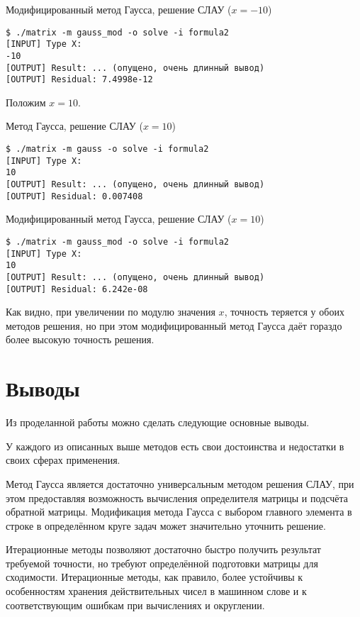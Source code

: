 \documentclass[a4paper,11pt]{report}
\begin{document}
\begin{bash}
\caption{Модифицированный метод Гаусса, решение СЛАУ ($x = -10$)}
\begin{verbatim}
$ ./matrix -m gauss_mod -o solve -i formula2 
[INPUT] Type X:
-10
[OUTPUT] Result: ... (опущено, очень длинный вывод)
[OUTPUT] Residual: 7.4998e-12
\end{verbatim}
\end{bash}

Положим $x = 10$.

\begin{bash}
\caption{Метод Гаусса, решение СЛАУ ($x = 10$)}
\begin{verbatim}
$ ./matrix -m gauss -o solve -i formula2 
[INPUT] Type X:
10
[OUTPUT] Result: ... (опущено, очень длинный вывод)
[OUTPUT] Residual: 0.007408
\end{verbatim}
\end{bash}


\begin{bash}
\caption{Модифицированный метод Гаусса, решение СЛАУ ($x = 10$)}
\begin{verbatim}
$ ./matrix -m gauss_mod -o solve -i formula2 
[INPUT] Type X:
10
[OUTPUT] Result: ... (опущено, очень длинный вывод)
[OUTPUT] Residual: 6.242e-08
\end{verbatim}
\end{bash}

Как видно, при увеличении по модулю значения $x$, точность теряется у обоих методов решения, но при этом
модифицированный метод Гаусса даёт гораздо более высокую точность решения.

\section*{Выводы}
Из проделанной работы можно сделать следующие основные выводы.

У каждого из описанных выше методов есть свои достоинства и недостатки в своих сферах применения. 

Метод Гаусса является достаточно универсальным методом решения СЛАУ, при этом предоставляя возможность вычисления определителя 
матрицы и подсчёта обратной матрицы. Модификация метода Гаусса с выбором главного элемента в строке в определённом круге задач 
может значительно уточнить решение.

Итерационные методы позволяют достаточно быстро получить результат требуемой точности, но требуют
определённой подготовки матрицы для сходимости. Итерационные методы, как правило, более устойчивы к особенностям хранения
действительных чисел в машинном слове и к соответствующим ошибкам при вычислениях и округлении.
\end{document}
